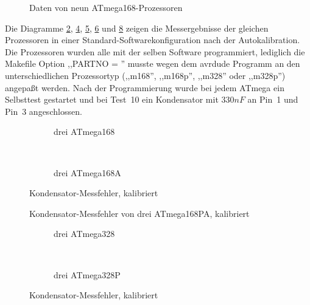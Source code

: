 \begin{figure}[H]
\centering

\caption{Daten von neun ATmega168-Prozessoren}
\label{fig:CompAdjust}
\end{figure}

Die Diagramme \ref{fig:mega168cal}, \ref{fig:mega168Acal}, \ref{fig:mega168PAcal},  \ref{fig:mega328cal} und
\ref{fig:mega328Pcal} zeigen die Messergebnisse
der gleichen Prozessoren in einer Standard-Softwarekonfiguration nach der Autokalibration.
Die Prozessoren wurden alle mit der selben Software programmiert, lediglich die Makefile Option ,,PARTNO = '' musste 
wegen dem avrdude Programm an den unterschiedlichen Prozessortyp (,,m168'', ,,m168p'', ,,m328'' oder ,,m328p'') angepaßt werden.
Nach der Programmierung wurde bei jedem ATmega ein
Selbsttest gestartet und bei Test~10 ein Kondensator mit \(330 nF\) an Pin~1 und Pin~3 angeschlossen.

\begin{figure}[H]
  \begin{subfigure}[b]{9cm}
    \centering
    \resizebox{9cm}{!}{}
    \caption{drei ATmega168}
    \label{fig:mega168cal}
  \end{subfigure}
  ~
  \begin{subfigure}[b]{9cm}
    \centering
    \resizebox{9cm}{!}{}
    \caption{drei ATmega168A}
    \label{fig:mega168Acal}
  \end{subfigure}
  \caption{Kondensator-Messfehler, kalibriert}
\end{figure}

\begin{figure}[H]
\centering

\caption{Kondensator-Messfehler von drei ATmega168PA, kalibriert}
\label{fig:mega168PAcal}
\end{figure}

\begin{figure}[H]
  \begin{subfigure}[b]{9cm}
    \centering
    \resizebox{9cm}{!}{}
    \caption{drei ATmega328}
    \label{fig:mega328cal}
  \end{subfigure}
  ~
  \begin{subfigure}[b]{9cm}
    \centering
    \resizebox{9cm}{!}{}
    \caption{drei ATmega328P}
    \label{fig:mega328Pcal}
  \end{subfigure}
  \caption{Kondensator-Messfehler, kalibriert}
\end{figure}

